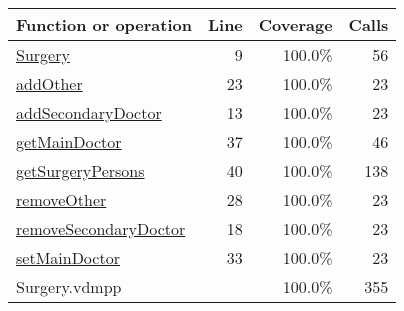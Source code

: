 \begin{longtable}{|l|r|r|r|}
\hline
Function or operation & Line & Coverage & Calls \\
\hline
\hline
\hyperref[Surgery:9]{Surgery} & 9&100.0\% & 56 \\
\hline
\hyperref[addOther:23]{addOther} & 23&100.0\% & 23 \\
\hline
\hyperref[addSecondaryDoctor:13]{addSecondaryDoctor} & 13&100.0\% & 23 \\
\hline
\hyperref[getMainDoctor:37]{getMainDoctor} & 37&100.0\% & 46 \\
\hline
\hyperref[getSurgeryPersons:40]{getSurgeryPersons} & 40&100.0\% & 138 \\
\hline
\hyperref[removeOther:28]{removeOther} & 28&100.0\% & 23 \\
\hline
\hyperref[removeSecondaryDoctor:18]{removeSecondaryDoctor} & 18&100.0\% & 23 \\
\hline
\hyperref[setMainDoctor:33]{setMainDoctor} & 33&100.0\% & 23 \\
\hline
\hline
Surgery.vdmpp & & 100.0\% & 355 \\
\hline
\end{longtable}

